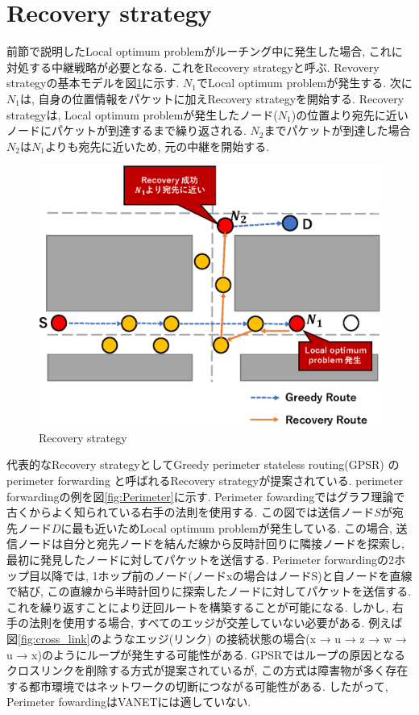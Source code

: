 \documentclass[10pt]{jreport}
\begin{document}
\section{Recovery strategy}
前節で説明したLocal optimum problemがルーチング中に発生した場合, これに対処する中継戦略が必要となる. これをRecovery strategy\cite{28}と呼ぶ. Revovery strategyの基本モデルを図\ref{fig:Recovery}に示す. $N_{1}$でLocal optimum problemが発生する. 次に$N_{1}$は, 自身の位置情報をパケットに加えRecovery strategyを開始する. Recovery strategyは, Local optimum problemが発生したノード($N_{1}$)の位置より宛先に近いノードにパケットが到達するまで繰り返される. $N_{2}$までパケットが到達した場合$N_{2}$は$N_{1}$よりも宛先に近いため, 元の中継を開始する. 
  

\begin{figure}[!ht]
	\centering
	\includegraphics[width=130mm]{figures/basic-recovery.eps}
	\caption{Recovery strategy}
	\label{fig:Recovery}
\end{figure}

代表的なRecovery strategyとしてGreedy perimeter stateless routing(GPSR) \cite{6}の perimeter forwarding
と呼ばれるRecovery strategyが提案されている. perimeter forwardingの例を図\ref{fig:Perimeter}に示す. Perimeter fowardingではグラフ理論で古くからよく知られている右手の法則を使用する. この図では送信ノード$S$が宛先ノード$D$に最も近いためLocal optimum problemが発生している. この場合, 送信ノードは自分と宛先ノードを結んだ線から反時計回りに隣接ノードを探索し, 最初に発見したノードに対してパケットを送信する. Perimeter forwardingの2ホップ目以降では, 1ホップ前のノード(ノードxの場合はノードS)と自ノードを直線で結び, この直線から半時計回りに探索したノードに対してパケットを送信する. これを繰り返すことにより迂回ルートを構築することが可能になる. 
しかし, 右手の法則を使用する場合, すべてのエッジが交差していない必要がある. 例えば図\ref{fig:cross_link}のようなエッジ(リンク) の接続状態の場合(x → u → z → w → u → x)のようにループが発生する可能性がある. GPSRではループの原因となるクロスリンクを削除する方式が提案されているが, この方式は障害物が多く存在する都市環境ではネットワークの切断につながる可能性がある. したがって, Perimeter fowardingはVANETには適していない.
\end{document}
